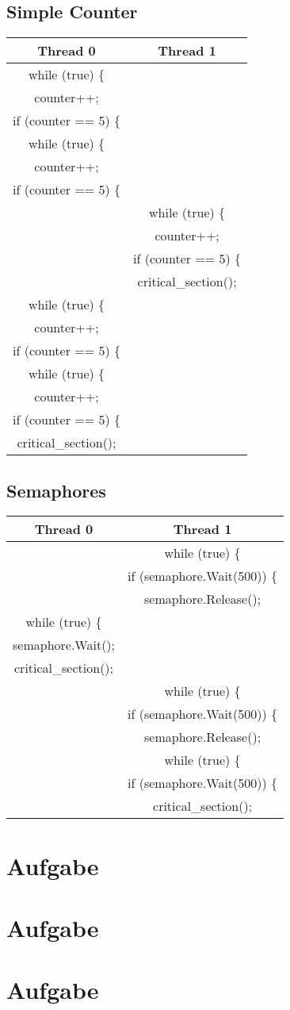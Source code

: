 \documentclass{scrartcl}
\begin{document}
\subsection{Simple Counter}

\begin{center}
\begin{tabular}{ c | c }
 Thread 0 & Thread 1 \\ [0.5ex] \hline \hline
 while (true) \{ & \\
 counter++; & \\
 if (counter == 5) \{ & \\
 while (true) \{ & \\
 counter++; & \\
 if (counter == 5) \{ & \\
  & while (true) \{ \\
  & counter++; \\
  & if (counter == 5) \{ \\
  & critical\_section(); \\
 while (true) \{ & \\
 counter++; & \\
 if (counter == 5) \{ & \\
 while (true) \{ & \\
 counter++; & \\
 if (counter == 5) \{ & \\
 critical\_section(); & \\ 
\end{tabular}
\end{center}

\subsection{Semaphores}

\begin{center}
\begin{tabular}{ c | c }
 Thread 0 & Thread 1 \\ [0.5ex] \hline \hline
  & while (true) \{ \\
  & if (semaphore.Wait(500)) \{ \\
  & semaphore.Release(); \\
 while (true) \{ & \\
 semaphore.Wait(); & \\
 critical\_section(); & \\
  & while (true) \{ \\
  & if (semaphore.Wait(500)) \{ \\
  & semaphore.Release(); \\
  & while (true) \{ \\
  & if (semaphore.Wait(500)) \{ \\
  & critical\_section(); \\
\end{tabular}
\end{center}

\section{Aufgabe}


\section{Aufgabe}


\section{Aufgabe}
\end{document}
